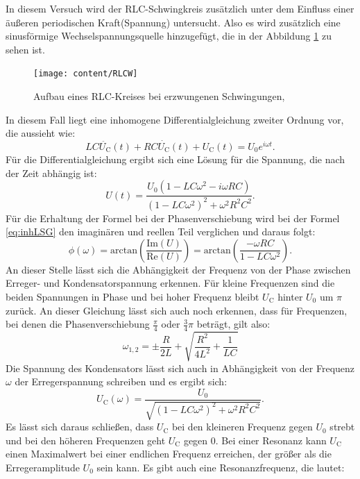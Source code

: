In diesem Versuch wird der RLC-Schwingkreis zusätzlich unter dem Einfluss einer äußeren periodischen Kraft(Spannung) untersucht. Also es wird zusätzlich eine sinusförmige Wechselspannungsquelle hinzugefügt, die in der Abbildung \ref{fig:rlcw} zu sehen ist. 
\begin{figure}[h!]
	\centering
	\texttt{[image: content/RLCW]}
	\caption{Aufbau eines RLC-Kreises bei erzwungenen Schwingungen,\cite[6]{anleitung354}}
	\label{fig:rlcw}
\end{figure}
In diesem Fall liegt eine inhomogene Differentialgleichung zweiter Ordnung vor, die aussieht wie:
\begin{equation}
\label{eq:inhDGL}
LC\ddot{U_\text{C}}(t) + RC\dot{U_\text{C}}(t) + U_\text{C}(t) = U_\text{0}e^{i\omega t}.
\end{equation}
Für die Differentialgleichung ergibt sich eine Lösung für die Spannung, die nach der Zeit abhängig ist:
\begin{equation}
\label{eq:inhLSG}
U(t) = \frac{U_{0}(1-LC\omega^{2}-i\omega RC)}{(1-LC\omega^{2})^{2}+\omega^{2}R^{2}C^{2}}.
\end{equation}
Für die Erhaltung der Formel bei der Phasenverschiebung wird bei der Formel \ref{eq:inhLSG} den imaginären und reellen Teil verglichen und daraus folgt:
\begin{equation}
\phi(\omega) = \text{arctan}\left(\frac{\text{Im}(U)}{\text{Re}(U)}\right) = \text{arctan}\left(\frac{-\omega RC}{1-LC\omega^{2}}\right).
\end{equation}
An dieser Stelle lässt sich die Abhängigkeit der Frequenz von der Phase zwischen Erreger- und Kondensatorspannung erkennen. Für kleine Frequenzen sind die beiden Spannungen in Phase und bei hoher Frequenz bleibt $U_\text{C}$ hinter $U_{0}$ um $\pi$ zurück.
An dieser Gleichung lässt sich auch noch erkennen, dass für Frequenzen, bei denen die Phasenverschiebung $\frac{\pi}{4}$ oder $\frac{3}{4}\pi$ beträgt, gilt also:
\begin{equation*}
\omega_{1,2} = \pm \frac{R}{2L} + \sqrt{\frac{R^{2}}{4L^{2}}+\frac{1}{LC}}
\end{equation*}
Die Spannung des Kondensators lässt sich auch in Abhängigkeit von der Frequenz $\omega$ der Erregerspannung schreiben und es ergibt sich:
\begin{equation}
\label{eq:UC}
U_\text{C}(\omega) = \frac{U_{0}}{\sqrt{(1-LC\omega^{2})^{2}+\omega^{2}R^{2}C^{2}}}.
\end{equation}
Es lässt sich daraus schließen, dass $U_\text{C}$ bei den kleineren Frequenz gegen $U_{0}$ strebt und bei den höheren Frequenzen geht $U_\text{C}$ gegen 0. Bei einer Resonanz kann $U_\text{C}$ einen Maximalwert bei einer endlichen Frequenz erreichen, der größer als die Erregeramplitude $U_{0}$ sein kann. Es gibt auch eine Resonanzfrequenz, die lautet:
